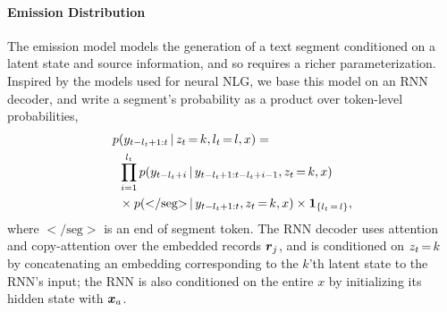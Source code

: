 \documentclass[11pt,a4paper]{article}
\begin{document}
\paragraph{Emission Distribution}
The emission model models the generation of a text segment conditioned on 
a latent state and source information, and so requires a richer parameterization. %
Inspired by the models used for neural NLG, we base this model on an RNN decoder, and write a segment's probability as a product over token-level probabilities,
\begin{align*}
    p&(y_{t-l_t+1:t} \,|\, z_t \, {=} \, k , l_t \, {=} \, l, x) = \\
    &\prod_{i=1}^{l_t} p(y_{t-l_t+i} \,|\, y_{t-l_t+1:t-l_t+i-1}, z_t \, {=} \, k, x) \\
    &\times p({<}\text{/seg}{>} \,|\, y_{t-l_t+1:t}, z_t \, {=} \, k, x) \times \mathbf{1}_{\{l_t \, {=} \, l\}},
\end{align*}
where ${<}\text{/seg}{>}$ is an end of segment token. The RNN decoder uses attention and copy-attention over the embedded records $\boldsymbol{r}_j$, and is conditioned on $z_t \, {=} \, k$ by concatenating an embedding corresponding to the $k$'th latent state to the RNN's input; the RNN is also conditioned on the entire $x$ by initializing its hidden state with $\boldsymbol{x}_a$.



\end{document}

